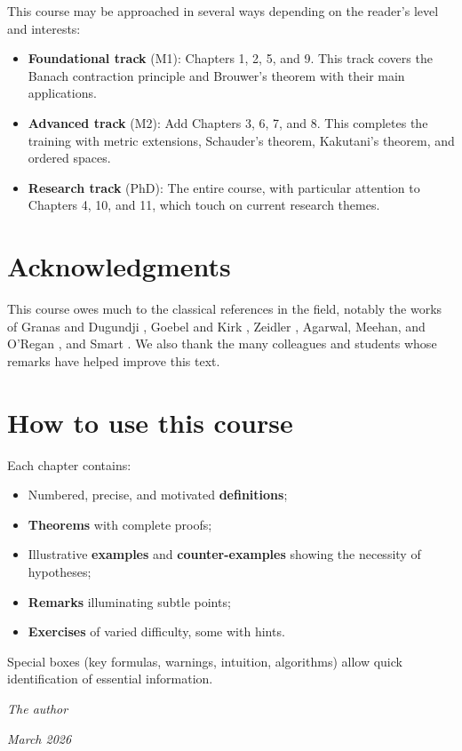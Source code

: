 This course may be approached in several ways depending on the reader's level
and interests:

\begin{itemize}
    \item \textbf{Foundational track} (M1): Chapters 1, 2, 5, and 9. This track
          covers the Banach contraction principle and Brouwer's theorem with
          their main applications.
    \item \textbf{Advanced track} (M2): Add Chapters 3, 6, 7, and 8. This
          completes the training with metric extensions, Schauder's theorem,
          Kakutani's theorem, and ordered spaces.
    \item \textbf{Research track} (PhD): The entire course, with particular
          attention to Chapters 4, 10, and 11, which touch on current research
          themes.
\end{itemize}

\section*{Acknowledgments}

This course owes much to the classical references in the field, notably the
works of Granas and Dugundji \cite{granas2003}, Goebel and Kirk
\cite{goebel1990}, Zeidler \cite{zeidler1986}, Agarwal, Meehan, and O'Regan
\cite{agarwal2001}, and Smart \cite{smart1974}. We also thank the many
colleagues and students whose remarks have helped improve this text.

\section*{How to use this course}

Each chapter contains:
\begin{itemize}
    \item Numbered, precise, and motivated \textbf{definitions};
    \item \textbf{Theorems} with complete proofs;
    \item Illustrative \textbf{examples} and \textbf{counter-examples} showing
          the necessity of hypotheses;
    \item \textbf{Remarks} illuminating subtle points;
    \item \textbf{Exercises} of varied difficulty, some with hints.
\end{itemize}

Special boxes (key formulas, warnings, intuition, algorithms) allow quick
identification of essential information.

\bigskip
\hfill \textit{The author}

\hfill \textit{March 2026}
